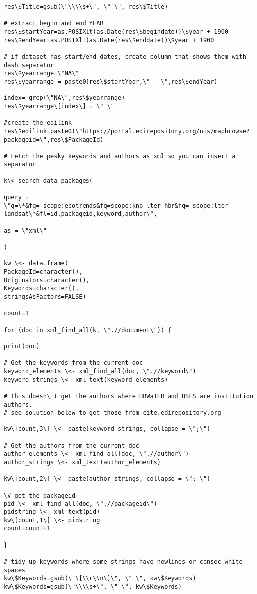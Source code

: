 \documentclass[
  letterpaper,
  DIV=11,
  numbers=noendperiod]{scrreprt}
\begin{document}
\begin{verbatim}
res\$Title=gsub(\"\\\\s+\", \" \", res\$Title)

# extract begin and end YEAR
res\$startYear=as.POSIXlt(as.Date(res\$begindate))\$year + 1900
res\$endYear=as.POSIXlt(as.Date(res\$enddate))\$year + 1900

# if dataset has start/end dates, create column that shows them with
dash separator
res\$yearrange=\"NA\"
res\$yearrange = paste0(res\$startYear,\" - \",res\$endYear)

index= grep(\"NA\",res\$yearrange)
res\$yearrange\[index\] = \" \"

#create the edilink
res\$edilink=paste0(\"https://portal.edirepository.org/nis/mapbrowse?packageid=\",res\$PackageId)

# Fetch the pesky keywords and authors as xml so you can insert a
separator

k\<-search_data_packages(

query =
\"q=\*&fq=-scope:ecotrends&fq=scope:knb-lter-hbr&fq=-scope:lter-landsat\*&fl=id,packageid,keyword,author\",

as = \"xml\"

)

kw \<- data.frame(
PackageId=character(),
Originators=character(),
Keywords=character(),
stringsAsFactors=FALSE)

count=1

for (doc in xml_find_all(k, \".//document\")) {

print(doc)

# Get the keywords from the current doc
keyword_elements \<- xml_find_all(doc, \".//keyword\")
keyword_strings \<- xml_text(keyword_elements)

# This doesn\'t get the authors where HBWaTER and USFS are institution
authors.
# see solution below to get those from cite.edirepository.org

kw\[count,3\] \<- paste(keyword_strings, collapse = \";\")

# Get the authors from the current doc
author_elements \<- xml_find_all(doc, \".//author\")
author_strings \<- xml_text(author_elements)

kw\[count,2\] \<- paste(author_strings, collapse = \"; \")

\# get the packageid
pid \<- xml_find_all(doc, \".//packageid\")
pidstring \<- xml_text(pid)
kw\[count,1\] \<- pidstring
count=count+1

}

# tidy up keywords where some strings have newlines or consec white
spaces
kw\$Keywords=gsub(\"\[\\r\\n\]\", \" \", kw\$Keywords)
kw\$Keywords=gsub(\"\\\\s+\", \" \", kw\$Keywords)


\end{verbatim}
\end{document}
